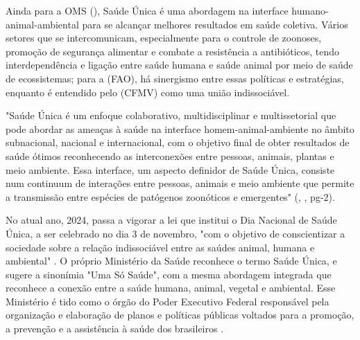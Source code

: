
\indent Ainda para a \acrshort{OMS} (\citeyear{OMS2022S1}), Saúde Única é uma abordagem na interface humano-animal-ambiental para se alcançar melhores resultados em saúde coletiva. Vários setores que se intercomunicam, especialmente para o controle de zoonoses, promoção de segurança alimentar e combate a resistência a antibióticos, tendo interdependência e ligação entre saúde humana e saúde animal por meio de saúde de ecossistemas; para a  (\acrshort{FAO}), há sinergismo entre essas políticas e estratégias, enquanto é entendido pelo  (\acrshort{CFMV}) como uma união indissociável.

\begin{citacao}
"Saúde Única é um enfoque colaborativo, multidisciplinar e multissetorial que pode abordar as ameaças à saúde na interface homem-animal-ambiente no âmbito subnacional, nacional e internacional, com o objetivo final de obter resultados de saúde ótimos reconhecendo as interconexões entre pessoas, animais, plantas e meio ambiente. Essa  interface, um aspecto definidor de Saúde Única, consiste num continuum de interações entre pessoas, animais e meio ambiente que permite a transmissão entre espécies de patógenos zoonóticos e emergentes" (\citeauthor{S1_OPAS_OMS}, \citeyear{S1_OPAS_OMS}, pg-2).
\end{citacao}


\indent No atual ano, 2024, passa a vigorar a lei que institui o Dia Nacional de Saúde Única, a ser celebrado no dia 3 de novembro, "com o objetivo de conscientizar a sociedade sobre a relação indissociável entre as saúdes animal, humana e ambiental" \cite{BRASIL2024LeiS1}. O próprio Ministério da Saúde reconhece o termo Saúde Única, e sugere a sinonímia "Uma Só Saúde", com a mesma abordagem integrada que reconhece a conexão entre a saúde humana, animal, vegetal e ambiental. Esse Ministério é tido como o órgão do Poder Executivo Federal responsável pela organização e elaboração de planos e políticas públicas voltados para a promoção, a prevenção e a assistência à saúde dos brasileiros \cite{MinisterioSaudeS1}.

